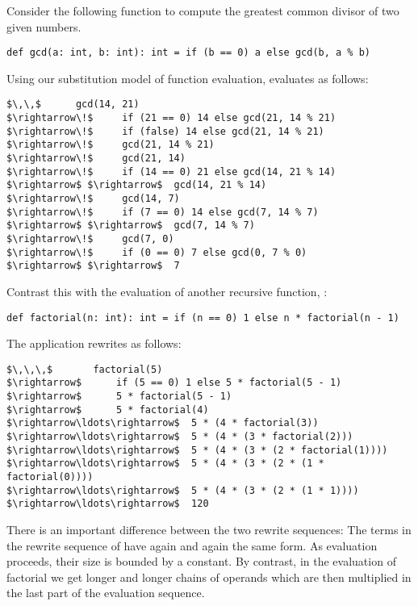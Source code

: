\documentclass[a4paper,12pt,twoside,titlepage]{book}
\begin{document}
Consider the following function to compute the greatest common divisor
of two given numbers.

\begin{lstlisting}
def gcd(a: int, b: int): int = if (b == 0) a else gcd(b, a % b)
\end{lstlisting}

Using our substitution model of function evaluation, 
 evaluates as follows:

\begin{lstlisting}
$\,\,$      gcd(14, 21)  
$\rightarrow\!$     if (21 == 0) 14 else gcd(21, 14 % 21)
$\rightarrow\!$     if (false) 14 else gcd(21, 14 % 21)
$\rightarrow\!$     gcd(21, 14 % 21)
$\rightarrow\!$     gcd(21, 14)
$\rightarrow\!$     if (14 == 0) 21 else gcd(14, 21 % 14)
$\rightarrow$ $\rightarrow$  gcd(14, 21 % 14)
$\rightarrow\!$     gcd(14, 7)
$\rightarrow\!$     if (7 == 0) 14 else gcd(7, 14 % 7)
$\rightarrow$ $\rightarrow$  gcd(7, 14 % 7)
$\rightarrow\!$     gcd(7, 0)
$\rightarrow\!$     if (0 == 0) 7 else gcd(0, 7 % 0)
$\rightarrow$ $\rightarrow$  7
\end{lstlisting}

Contrast this with the evaluation of another recursive function, 
:

\begin{lstlisting}
def factorial(n: int): int = if (n == 0) 1 else n * factorial(n - 1)
\end{lstlisting}

The application  rewrites as follows:
\begin{lstlisting}
$\,\,\,$       factorial(5)
$\rightarrow$      if (5 == 0) 1 else 5 * factorial(5 - 1)
$\rightarrow$      5 * factorial(5 - 1)
$\rightarrow$      5 * factorial(4)
$\rightarrow\ldots\rightarrow$  5 * (4 * factorial(3))
$\rightarrow\ldots\rightarrow$  5 * (4 * (3 * factorial(2)))
$\rightarrow\ldots\rightarrow$  5 * (4 * (3 * (2 * factorial(1))))
$\rightarrow\ldots\rightarrow$  5 * (4 * (3 * (2 * (1 * factorial(0))))
$\rightarrow\ldots\rightarrow$  5 * (4 * (3 * (2 * (1 * 1))))
$\rightarrow\ldots\rightarrow$  120
\end{lstlisting}
There is an important difference between the two rewrite sequences:
The terms in the rewrite sequence of  have again and again
the same form. As evaluation proceeds, their size is bounded by a
constant. By contrast, in the evaluation of factorial we get longer
and longer chains of operands which are then multiplied in the last
part of the evaluation sequence.
\end{document}
